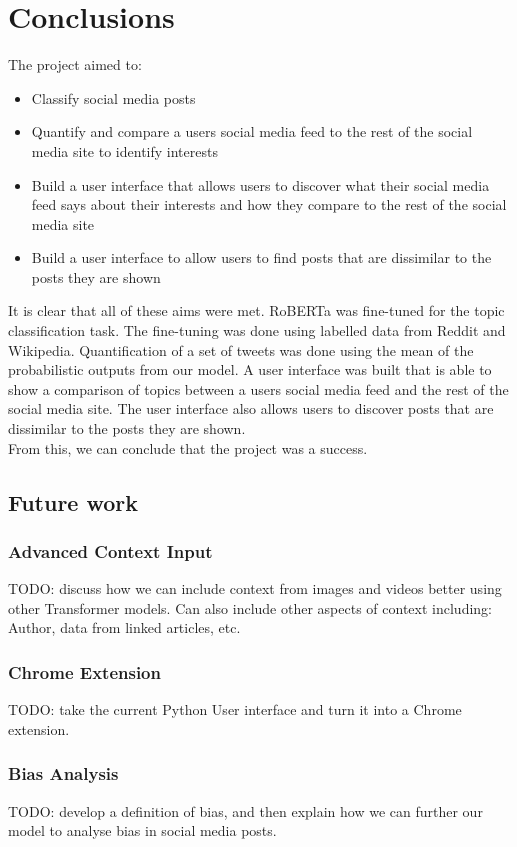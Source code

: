 \chapter{Conclusions}
\label{ch:conclusions}

The project aimed to:
\begin{itemize}
    \item Classify social media posts
    \item Quantify and compare a users social media feed to the rest of the social media site to identify interests
    \item Build a user interface that allows users to discover what their social media feed says about their interests and how they compare to the rest of the social media site
    \item Build a user interface to allow users to find posts that are dissimilar to the posts they are shown
\end{itemize}

It is clear that all of these aims were met. RoBERTa was fine-tuned for the topic classification task. The fine-tuning was done
using labelled data from Reddit and Wikipedia. Quantification of a set of tweets was done using the mean of the probabilistic outputs
from our model. A user interface was built that is able to show a comparison of topics between a users social media feed and the rest
of the social media site. The user interface also allows users to discover posts that are dissimilar to the posts they are shown.\\
From this, we can conclude that the project was a success.
\section{Future work}
\subsection{Advanced Context Input}
TODO: discuss how we can include context from images and videos better using other Transformer models.
Can also include other aspects of context including: Author, data from linked articles, etc.
\subsection{Chrome Extension}
TODO: take the current Python User interface and turn it into a Chrome extension.
\subsection{Bias Analysis}
TODO: develop a definition of bias, and then explain how we can further our model to analyse bias in social media posts.